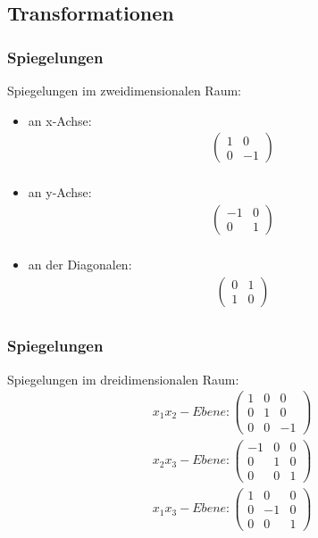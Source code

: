 \subsection{Transformationen}

\begin{frame}
	\frametitle{Spiegelungen}
	Spiegelungen im zweidimensionalen Raum:
	\begin{itemize}
		\item an x-Achse: \begin{gather*} \begin{pmatrix}
			1 & 0 \\
			0 & -1
			\end{pmatrix} \\ \end{gather*}
		\item an y-Achse:  \begin{gather*} \begin{pmatrix}
			-1 & 0 \\
			0 & 1
		\end{pmatrix} \\ \end{gather*}
		\item an der Diagonalen: \begin{gather*} \begin{pmatrix}
			0 & 1 \\
			1 & 0
			\end{pmatrix} \\ \end{gather*}
	\end{itemize}
\end{frame}

\begin{frame}
	\frametitle{Spiegelungen}
	Spiegelungen im dreidimensionalen Raum:
		\begin{gather*} x_{1}x_{2}-Ebene: \begin{pmatrix}
			1 & 0 & 0\\
			0 & 1 & 0\\
			0 & 0 & -1
			\end{pmatrix} \\
		x_{2}x_{3}-Ebene: \begin{pmatrix}
			-1 & 0 & 0\\
			0 & 1 & 0\\
			0 & 0 & 1
		\end{pmatrix} \\
		x_{1}x_{3}-Ebene: \begin{pmatrix}
			1 & 0 & 0\\
			0 & -1 & 0\\
			0 & 0 & 1
		\end{pmatrix} \\ \end{gather*}
\end{frame}

